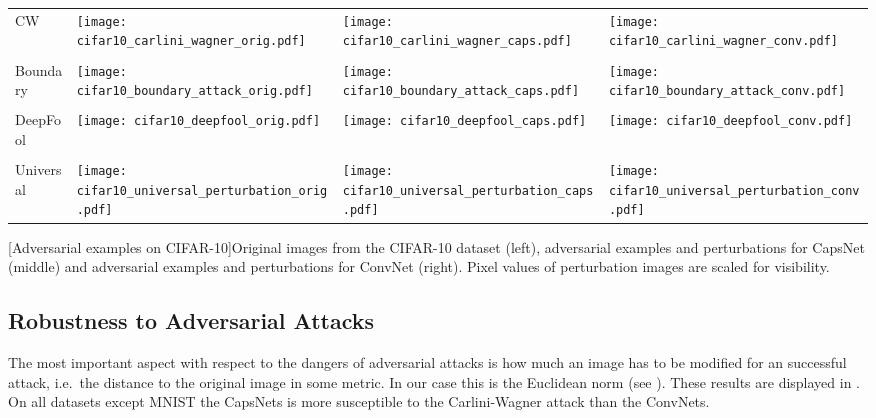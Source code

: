 \begin{center}
\begin{longtable*}{m{1.6cm}m{2.2cm}m{4.2cm}m{4.2cm}}
	\raggedleft CW & 
	\texttt{[image: cifar10\_carlini\_wagner\_orig.pdf]} & \texttt{[image: cifar10\_carlini\_wagner\_caps.pdf]} & \texttt{[image: cifar10\_carlini\_wagner\_conv.pdf]}\\
	\\
	\raggedleft Boundary &
	\texttt{[image: cifar10\_boundary\_attack\_orig.pdf]} & \texttt{[image: cifar10\_boundary\_attack\_caps.pdf]} & \texttt{[image: cifar10\_boundary\_attack\_conv.pdf]}\\
	\\
	\raggedleft DeepFool&
	\texttt{[image: cifar10\_deepfool\_orig.pdf]} & \texttt{[image: cifar10\_deepfool\_caps.pdf]} & \texttt{[image: cifar10\_deepfool\_conv.pdf]}\\
	\\
	\raggedleft Universal&
	\texttt{[image: cifar10\_universal\_perturbation\_orig.pdf]} & \texttt{[image: cifar10\_universal\_perturbation\_caps.pdf]} & \texttt{[image: cifar10\_universal\_perturbation\_conv.pdf]}
\end{longtable*}
[Adversarial examples on CIFAR-10]{Original images from the CIFAR-10 dataset (left), adversarial examples and perturbations for CapsNet (middle) and adversarial examples and perturbations for ConvNet (right). Pixel values of perturbation images are scaled for visibility.}
\label{fig:images}
\end{center}

\subsection{Robustness to Adversarial Attacks}

The most important aspect with respect to the dangers of adversarial attacks is how much an image has to be modified for an successful attack, i.e.\ the distance to the original image in some metric.
In our case this is the Euclidean norm (see ).
These results are displayed in .
On all datasets except MNIST the CapsNets is more susceptible to the Carlini-Wagner attack than the ConvNets.

